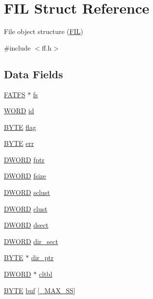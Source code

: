 \hypertarget{structFIL}{\section{F\-I\-L Struct Reference}
\label{structFIL}
}


File object structure (\hyperlink{structFIL}{F\-I\-L})  




{\ttfamily \#include $<$ff.\-h$>$}

\subsection*{Data Fields}
\begin{DoxyCompactItemize}
\item 
\hyperlink{structFATFS}{F\-A\-T\-F\-S} $\ast$ \hyperlink{structFIL_a42376a6797a06228911c8b836c1e9030}{fs}
\item 
\hyperlink{integer_8h_a197942eefa7db30960ae396d68339b97}{W\-O\-R\-D} \hyperlink{structFIL_af7cae0063b0045fb7078b560101ba8f2}{id}
\item 
\hyperlink{integer_8h_a4ae1dab0fb4b072a66584546209e7d58}{B\-Y\-T\-E} \hyperlink{structFIL_ac409508881f5a16f2998ae675072b376}{flag}
\item 
\hyperlink{integer_8h_a4ae1dab0fb4b072a66584546209e7d58}{B\-Y\-T\-E} \hyperlink{structFIL_aea440945db26de9c4a88065c0c887fda}{err}
\item 
\hyperlink{integer_8h_ad342ac907eb044443153a22f964bf0af}{D\-W\-O\-R\-D} \hyperlink{structFIL_a75d29cf9257c827d117887b9f924c4a9}{fptr}
\item 
\hyperlink{integer_8h_ad342ac907eb044443153a22f964bf0af}{D\-W\-O\-R\-D} \hyperlink{structFIL_aa00790d40d7b0081c345fd4f76e22b70}{fsize}
\item 
\hyperlink{integer_8h_ad342ac907eb044443153a22f964bf0af}{D\-W\-O\-R\-D} \hyperlink{structFIL_ad308b74c8d6975c6a9c30d90b4124c40}{sclust}
\item 
\hyperlink{integer_8h_ad342ac907eb044443153a22f964bf0af}{D\-W\-O\-R\-D} \hyperlink{structFIL_aa41312aba551b9a6d1c9d3c8c7d2734b}{clust}
\item 
\hyperlink{integer_8h_ad342ac907eb044443153a22f964bf0af}{D\-W\-O\-R\-D} \hyperlink{structFIL_ab3d4165d6fd32ac71a130d835fbf0b4d}{dsect}
\item 
\hyperlink{integer_8h_ad342ac907eb044443153a22f964bf0af}{D\-W\-O\-R\-D} \hyperlink{structFIL_ab203794f939ad4480e81dfa488770783}{dir\-\_\-sect}
\item 
\hyperlink{integer_8h_a4ae1dab0fb4b072a66584546209e7d58}{B\-Y\-T\-E} $\ast$ \hyperlink{structFIL_a5af9e9fb312b629220eaf684dd28c4a9}{dir\-\_\-ptr}
\item 
\hyperlink{integer_8h_ad342ac907eb044443153a22f964bf0af}{D\-W\-O\-R\-D} $\ast$ \hyperlink{structFIL_a28a30613d48cefcf9efbd334cd861fc8}{cltbl}
\item 
\hyperlink{integer_8h_a4ae1dab0fb4b072a66584546209e7d58}{B\-Y\-T\-E} \hyperlink{structFIL_a7a95fb86588663e48309b5cded7e207b}{buf} \mbox{[}\hyperlink{ffconf_8h_ac271b697378912f17132cb9c7d0de024}{\-\_\-\-M\-A\-X\-\_\-\-S\-S}\mbox{]}
\end{DoxyCompactItemize}


